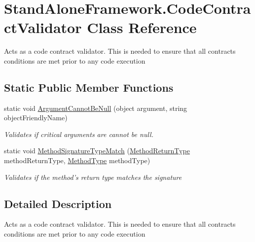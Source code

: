 \hypertarget{class_stand_alone_framework_1_1_code_contract_validator}{\section{Stand\+Alone\+Framework.\+Code\+Contract\+Validator Class Reference}
\label{class_stand_alone_framework_1_1_code_contract_validator}
}


Acts as a code contract validator. This is needed to ensure that all contracts conditions are met prior to any code execution  


\subsection*{Static Public Member Functions}
\begin{DoxyCompactItemize}
\item 
static void \hyperlink{class_stand_alone_framework_1_1_code_contract_validator_aa47caa22c758b103e35f5e305738d5a2}{Argument\+Cannot\+Be\+Null} (object argument, string object\+Friendly\+Name)
\begin{DoxyCompactList}\small\item\em Validates if critical arguments are cannot be null. \end{DoxyCompactList}\item 
static void \hyperlink{class_stand_alone_framework_1_1_code_contract_validator_a448af5fcb383e17a3099d658d9b3fa0e}{Method\+Signature\+Type\+Match} (\hyperlink{namespace_stand_alone_framework_1_1_factories_1_1_method_factory_a03ffbf0d8e733b86d0ac29ae38dd4241}{Method\+Return\+Type} method\+Return\+Type, \hyperlink{namespace_stand_alone_framework_1_1_factories_1_1_method_factory_aeb6e05dc016e73b072faae5a5d275f6a}{Method\+Type} method\+Type)
\begin{DoxyCompactList}\small\item\em Validates if the method's return type matches the signature \end{DoxyCompactList}\end{DoxyCompactItemize}


\subsection{Detailed Description}
Acts as a code contract validator. This is needed to ensure that all contracts conditions are met prior to any code execution 




